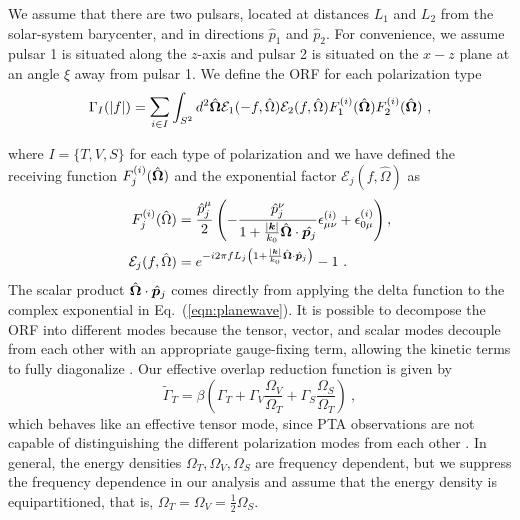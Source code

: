 \documentclass[prd,twocolumn,aps,psfig,nofootinbib,nobibnotes,superscriptaddress,preprintnumbers,times]{revtex4-2}
\begin{document}
We assume that there are two pulsars, located at distances $L_1$ and $L_2$ from the solar-system barycenter, and in directions $\hat{p}_1$ and $\hat{p}_2$. For convenience, we assume pulsar 1 is situated along the $z$-axis and pulsar 2 is situated on the $x-z$ plane at an angle $\xi$ away from pulsar 1. We define the ORF for each polarization type
\begin{equation}\label{eq:orf_type}
    \Gamma_I(|f|) = \mathlarger{\sum}_{i \in I} \int_{S^2} d^2 \hat{\bf{\Omega}} \mathcal{E}_1(-f, \hat{\Omega}) \mathcal{E}_2(f, \hat{\Omega}) F_1^{(i)}(\hat{\bf{\Omega}}) F_2^{(i)}(\hat{\bf{\Omega}}) \ ,
\end{equation}

where $I = \{T,V,S\}$ for each type of polarization and we have defined the receiving function $F^{(i)}_j(\hat{\bf \Omega})$ and the exponential factor $\mathcal{E}_j(f, \hat{\Omega})$ as 
\begin{equation}\label{eqn:recieving}
    \begin{aligned}
        F^{(i)}_j(\hat{\Omega}) &= \frac{\hat{p}^\mu_j}{2}\left(-\frac{\hat{p}^\nu_j}{1+\frac{|\boldsymbol{k}|}{k_0} \hat{\boldsymbol{\Omega}} \cdot \hat{{\boldsymbol{p}}_j}} \epsilon_{\mu \nu}^{(i)}+\epsilon_{0 \mu}^{(i)}\right) , \\ 
        \mathcal{E}_j(f, \hat{\Omega}) &= e^{-i2\pi f L_j\left( 1 + \frac{|\boldsymbol{k}|}{k_0} \hat{\bf \Omega}\cdot \hat{\boldsymbol{p}}_j\right)} - 1 \ . 
    \end{aligned}
\end{equation}
The scalar product $\hat{\bf \Omega}\cdot \hat{\boldsymbol{p}}_j$ comes directly from applying the delta function to the complex exponential in 
Eq.~(\ref{eqn:planewave}). 
It is possible to decompose the ORF into different modes because the tensor, vector, and scalar modes decouple from each other with an appropriate gauge-fixing term, allowing the kinetic terms to fully diagonalize \cite{Hinterbichler:2011tt}. Our effective overlap reduction function is given by 
\begin{equation}\label{eq:eff_orf}
    \tilde{\Gamma}_{T} = \beta \left(\Gamma_{T} + \Gamma_{V} \frac{\Omega_V}{\Omega_T} + \Gamma_{S} \frac{\Omega_S}{\Omega_T} \right) \ ,
\end{equation}
which behaves like an effective tensor mode, since PTA observations are not capable of distinguishing the different polarization modes from each other \cite{Liang:2021bct}. In general, the energy densities $\Omega_T, \Omega_V,\Omega_S$ are frequency dependent, but we suppress the frequency dependence in our analysis and assume that the energy density is equipartitioned, that is, $\Omega_T = \Omega_V = \frac{1}{2}\Omega_S$. 
\end{document}
